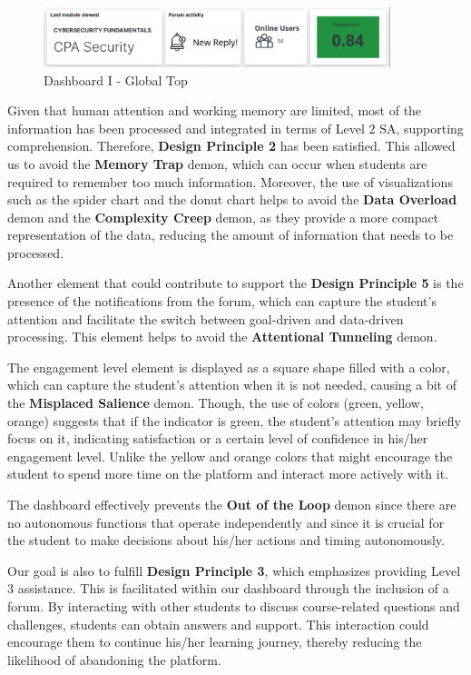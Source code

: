 \begin{figure}[H]
    \centering
    \includegraphics[width=0.9\textwidth]{assets/dashboard_1_globaltop.png}
    \caption{Dashboard I - Global Top}
    \label{fig:dashboard_1_global_top}
\end{figure}

Given that human attention and working memory are limited, most of the information has been processed and integrated in terms of Level 2 SA, supporting comprehension. Therefore, \textbf{Design Principle 2} has been satisfied.
This allowed us to avoid the \textbf{Memory Trap} demon, which can occur when students are required to remember too much information. 
Moreover, the use of visualizations such as the spider chart and the donut chart helps to avoid the \textbf{Data Overload} demon and the \textbf{Complexity Creep} demon, as they provide a more compact representation of the data, reducing the amount of information that needs to be processed.

Another element that could contribute to support the \textbf{Design Principle 5} is the presence of the notifications from the forum, which can capture the student's attention and facilitate the switch between goal-driven and data-driven processing. This element helps to avoid the \textbf{Attentional Tunneling} demon.

The engagement level element is displayed as a square shape filled with a color, which can capture the student's attention when it is not needed, causing a bit of the \textbf{Misplaced Salience} demon. 
Though, the use of colors (green, yellow, orange) suggests that if the indicator is green, the student's attention may briefly focus on it, indicating satisfaction or a certain level of confidence in his/her engagement level. Unlike the yellow and orange colors that might encourage the student to spend more time on the platform and interact more actively with it.

The dashboard effectively prevents the \textbf{Out of the Loop} demon since there are no autonomous functions that operate independently and since it is crucial for the student to make decisions about his/her actions and timing autonomously.

Our goal is also to fulfill \textbf{Design Principle 3}, which emphasizes providing Level 3 assistance. 
This is facilitated within our dashboard through the inclusion of a forum. By interacting with other students to discuss course-related 
questions and challenges, students can obtain answers and support. This interaction could encourage them to continue his/her learning journey, 
thereby reducing the likelihood of abandoning the platform. 

